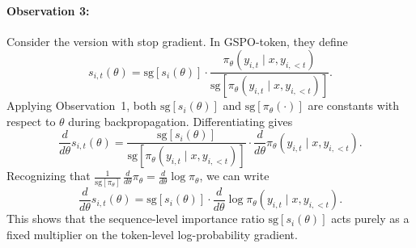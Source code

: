\documentclass{article}
\begin{document}
\paragraph{Observation 3:}
Consider the version with stop gradient.
In GSPO-token, they define
\[
s_{i,t}(\theta) =
\mathrm{sg}\!\left[ s_i(\theta) \right] \cdot
\frac{\pi_\theta(y_{i,t} \mid x, y_{i,<t})}
{\mathrm{sg}\!\left[ \pi_\theta(y_{i,t} \mid x, y_{i,<t}) \right]}.
\]
Applying Observation~1, both $\mathrm{sg}[s_i(\theta)]$ and $\mathrm{sg}[\pi_\theta(\cdot)]$
are constants with respect to $\theta$ during backpropagation. Differentiating gives
\[
\frac{d}{d\theta} s_{i,t}(\theta)
= \frac{\mathrm{sg}[s_i(\theta)]}
       {\mathrm{sg}[\pi_\theta(y_{i,t} \mid x, y_{i,<t})]}
  \cdot \frac{d}{d\theta} \pi_\theta(y_{i,t} \mid x, y_{i,<t}).
\]
Recognizing that $\frac{1}{\mathrm{sg}[\pi_\theta]}\,\frac{d}{d\theta} \pi_\theta
= \frac{d}{d\theta} \log \pi_\theta$, we can write
\[
\frac{d}{d\theta} s_{i,t}(\theta)
= \mathrm{sg}[s_i(\theta)] \cdot
  \frac{d}{d\theta} \log \pi_\theta(y_{i,t} \mid x, y_{i,<t}).
\]
This shows that the sequence-level importance ratio $\mathrm{sg}[s_i(\theta)]$
acts purely as a fixed multiplier on the token-level log-probability gradient.
\end{document}
